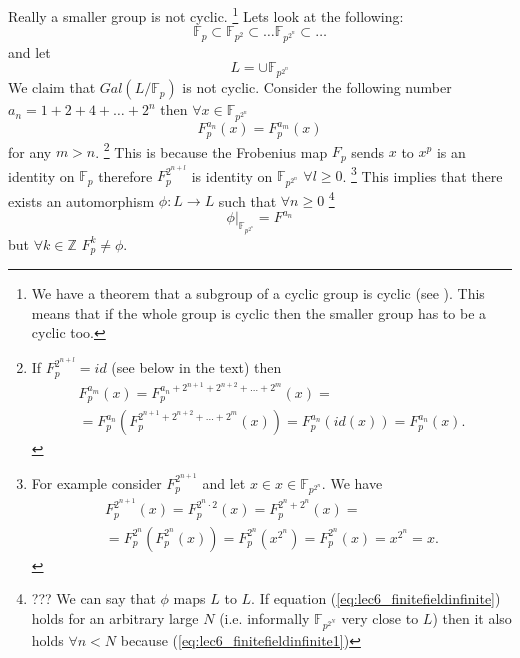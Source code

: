 Really a smaller group is not cyclic.
\footnote{
  We have a theorem that a subgroup of a cyclic group is cyclic
  (see ).
  This
  means that if the whole group is cyclic then the smaller group has
  to be a cyclic too.
}
Lets look at the following:
\[
\mathbb{F}_p \subset \mathbb{F}_{p^2} \subset \dots
\mathbb{F}_{p^{2^n}} \subset \dots
\]
and let
\[
L = \cup \mathbb{F}_{p^{2^n}}
\]
We claim that $Gal\left(L/\mathbb{F}_p\right)$ is not cyclic. Consider
the following number $a_n = 1+ 2 + 4 + \dots + 2^n$ then
$\forall x \in \mathbb{F}_{p^{2^n}}$
\begin{equation}
  F_p^{a_n}\left(x\right) = F_p^{a_m}\left(x\right)
  \label{eq:lec6_finitefieldinfinite1}
\end{equation}
for any $m > n$.
\footnote{
  If $F_p^{2^{n+l}} = id$ (see below in the text) then
  \begin{eqnarray} 
  F_p^{a_m}\left(x\right) = F_p^{a_n + 2^{n + 1} + 2^{n+2} + \dots +
    2^m}\left(x\right) =
  \nonumber \\
  = F_p^{a_n}\left(F_p^{2^{n + 1} + 2^{n+2} + \dots +
    2^m}\left(x\right)\right) =
  F_p^{a_n}\left(id\left(x\right)\right) =
  F_p^{a_n}\left(x\right).
  \nonumber
  \end{eqnarray}
}
This is because the Frobenius map $F_p$ sends $x$ to $x^p$ is an
identity on $\mathbb{F}_p$ therefore $F_p^{2^{n+l}}$ is identity on
$\mathbb{F}_{p^{2^n}}$ $\forall l \ge 0$.
\footnote{
  For example consider $F_p^{2^{n+1}}$ and let $x \in x
  \in \mathbb{F}_{p^{2^n}}$. We have
  \begin{eqnarray}
  F_p^{2^{n+1}}\left(x\right) =
  F_p^{2^n \cdot 2}\left(x\right) =
  F_p^{2^n + 2^n}\left(x\right) =
  \nonumber \\
  =
  F_p^{2^n}\left(F_p^{2^n}\left(x\right)\right) =
  F_p^{2^n}\left(x^{2^n}\right) =
  F_p^{2^n}\left(x\right) = x^{2^n} = x.
  \nonumber
  \end{eqnarray}
}
This implies
that
there exists an automorphism $\phi: L \to L$ such that
$\forall n \ge 0$
\footnote{
  ??? We can say that $\phi$ maps $L$ to $L$. If equation
  (\ref{eq:lec6_finitefieldinfinite}) holds for an arbitrary large $N$
  (i.e. informally $\mathbb{F}_{p^{2^N}}$ very
  close  to $L$)
  then it also holds $\forall n < N$ because
  (\ref{eq:lec6_finitefieldinfinite1})
}
\begin{equation}
  \left.\phi\right|_{\mathbb{F}_{p^{2^n}}} = F^{a_n}
  \label{eq:lec6_finitefieldinfinite}
\end{equation}
but $\forall k \in \mathbb{Z}$ $F_p^k \ne \phi$.
